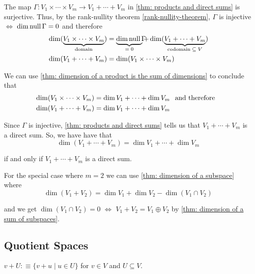 \begin{prf}
  The map $\Gamma: V_1 \times \cdots \times V_m \to V_1 + \cdots + V_m$ in \ref{thm: products and direct sums} is surjective. Thus, by the rank-nullity theorem \ref{rank-nullity-theorem}, $\Gamma$ is injective $\iff$ $\dim \operatorname{null} \Gamma = 0$ and therefore
  \[
  \begin{aligned}
    &\dim (\underbrace{V_1 \times \cdots \times V_m}_{\text{domain}})=\underbrace{\dim \mynull \Gamma \phantom{V_m} \! \! \! \! \! \! \! \! \! \! \!}_{= \; 0} +  \dim(\underbrace{V_1 + \cdots + V_m}_{\text{codomain} \; \subseteq \; V
    }) \\
    &\dim (V_1 + \cdots + V_m) = \dim (V_1 \times \cdots \times V_m)
  \end{aligned}
  \]

  We can use \ref{thm: dimension of a product is the sum of dimensions} to conclude that
  \begin{equation}
    \begin{aligned}
      &\dim (V_1 \times \cdots \times V_m) = \dim V_1 + \cdots + \dim V_m \;\;\, \text{and therefore }\;\; \\
      &\dim (V_1 + \cdots + V_m) =  \dim V_1 + \cdots + \dim V_m
    \end{aligned}
  \end{equation}


  Since $\Gamma$ is injective, \ref{thm: products and direct sums} tells us that $V_1+\cdots+V_m$ is a direct sum.
  So, we have have that
  \[\dim (V_1 + \cdots + V_m) =  \dim V_1 + \cdots + \dim V_m
  \]

  if and only if $V_1+\cdots+V_m$ is a direct sum.

   For the special case where $m=2$ we can use \ref{thm: dimension of a subspace} where
  \[
    \dim (V_1 + V_2) = \dim V_1 + \dim V_2 - \dim (V_1 \cap V_2)
  \]

  and we get $\dim (V_1 \cap V_2) = 0$ $\iff$ $V_1 + V_2 = V_1 \oplus V_2$ by \ref{thm: dimension of a sum of subspaces}.
\end{prf}

\subsection{Quotient Spaces}

\setcounter{thm}{94}
\begin{mydef} [notation $v+U$]
  $v+U :\equiv \{v+u \mid u\in U\}$ for $v\in V$ and $U\subseteq V$.
\end{mydef}

